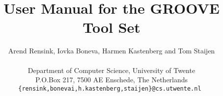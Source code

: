 \documentclass[11pt]{article}
\begin{document}
\title{User Manual for the GROOVE Tool Set}
\author{Arend Rensink, Iovka Boneva, Harmen Kastenberg and Tom Staijen \\
%
\vspace{0.2in} \\
%
Department of Computer Science, University of Twente \\
P.O.Box 217, 7500 AE Enschede, The Netherlands \\
\tt{\{rensink,bonevai,h.kastenberg,staijen\}@cs.utwente.nl}
}
\maketitle

\tableofcontents



















\end{document}

